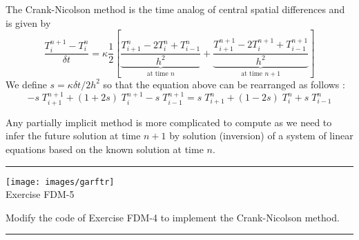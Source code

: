 The Crank-Nicolson method is the time analog of central spatial differences and is given by
\begin{equation}
\frac{T_{i}^{n+1}-T_i^n}{\delta t} 
= \kappa  \frac{1}{2} \left[
\underbrace{\frac{T_{i+1}^{n} - 2T_i^{n} + T_{i-1}^{n}}{h^2}}_{\text{at time } n}
+
\underbrace{\frac{T_{i+1}^{n+1} - 2T_i^{n+1} + T_{i-1}^{n+1}}{h^2}}_{\text{at time } n+1}
\right]
\end{equation}
We define $s=\kappa \delta t/ 2h^2$ so that the equation above can be rearranged as follows :
\begin{equation}
\boxed{
-s\; T_{i+1}^{n+1} + (1+2s)\;  T_{i}^{n+1} 
-s\;  T_{i-1}^{n+1} = 
s\; T_{i+1}^{n} + (1-2s)\; T_{i}^{n} + s\; T_{i-1}^{n} 
}
\end{equation}

Any partially implicit method is more complicated to compute as we need to infer the future solution 
at time $n+1$ by solution (inversion) of a system of linear equations based on the known solution at time $n$. 

\begin{center}

\end{center}

\begin{center}
\begin{minipage}[t]{0.77\textwidth}
\par\noindent\rule{\textwidth}{0.4pt}

\begin{center}
\texttt{[image: images/garftr]} \\
{\color{orange}Exercise FDM-5}
\end{center}

Modify the code of Exercise FDM-4 to implement the Crank-Nicolson method.

\par\noindent\rule{\textwidth}{0.4pt}
\end{minipage}
\end{center}






